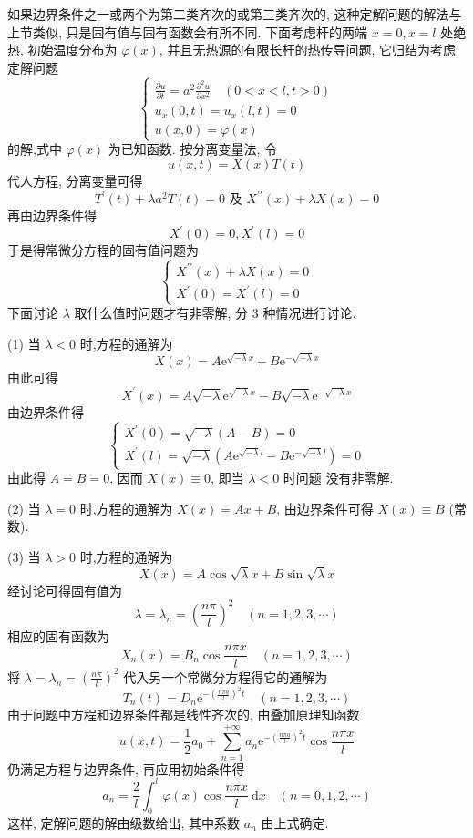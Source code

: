 如果边界条件之一或两个为第二类齐次的或第三类齐次的, 这种定解问题的解法与上节类似, 只是固有值与固有函数会有所不同. 下面考虑杆的两端 $ x=0, x=l $ 处绝热, 初始温度分布为 $ \varphi(x) $, 并且无热源的有限长杆的热传导问题, 它归结为考虑定解问题
$$
\left\{\begin{array}{l}
\frac{\partial u}{\partial t}=a^{2} \frac{\partial^{2} u}{\partial x^{2}} \quad(0<x<l, t>0) \\
u_{x}(0, t)=u_{x}(l, t)=0 \\
u(x, 0)=\varphi(x)
\end{array}\right.
$$
的解,式中 $ \varphi(x) $ 为已知函数.
按分离变量法, 令
$$
u(x, t)=X(x) T(t)
$$
代人方程, 分离变量可得
$$
T^{\prime}(t)+\lambda a^{2} T(t)=0 \text { 及 } X^{\prime \prime}(x)+\lambda X(x)=0
$$
再由边界条件得
$$
X^{\prime}(0)=0, X^{\prime}(l)=0
$$
于是得常微分方程的固有值问题为
$$
\left\{\begin{array}{l}
X^{\prime \prime}(x)+\lambda X(x)=0 \\
X^{\prime}(0)=X^{\prime}(l)=0
\end{array}\right.
$$
下面讨论 $ \lambda $ 取什么值时问题才有非零解, 分 3 种情况进行讨论.

(1) 当 $ \lambda<0 $ 时,方程的通解为
$$
X(x)=A \mathrm{e}^{\sqrt{-\lambda} x}+B \mathrm{e}^{-\sqrt{-\lambda} x}
$$
由此可得
$$
X^{\prime}(x)=A \sqrt{-\lambda} \mathrm{e}^{\sqrt{-\lambda} x}-B \sqrt{-\lambda} \mathrm{e}^{-\sqrt{-\lambda} x}
$$
由边界条件得
$$
\left\{\begin{array}{l}
X^{\prime}(0)=\sqrt{-\lambda}(A-B)=0 \\
X^{\prime}(l)=\sqrt{-\lambda}\left(A \mathrm{e}^{\sqrt{-\lambda} l}-B \mathrm{e}^{-\sqrt{-\lambda} l}\right)=0
\end{array}\right.
$$
由此得 $ A=B=0 $, 因而 $ X(x) \equiv 0 $, 即当 $ \lambda<0 $ 时问题 没有非零解.

(2) 当 $ \lambda=0 $ 时,方程的通解为 $ X(x)=A x+B $, 由边界条件可得 $ X(x) \equiv B $ (常数).

(3) 当 $ \lambda>0 $ 时,方程的通解为
$$
X(x)=A \cos \sqrt{\lambda} x+B \sin \sqrt{\lambda} x
$$
经讨论可得固有值为
$$
\lambda=\lambda_{n}=\left(\frac{n \pi}{l}\right)^{2} \quad(n=1,2,3, \cdots)
$$
相应的固有函数为
$$
X_{n}(x)=B_{n} \cos \frac{n \pi x}{l} \quad(n=1,2,3, \cdots)
$$
将 $ \lambda=\lambda_{n}=\left(\frac{n \pi}{l}\right)^{2} $ 代入另一个常微分方程得它的通解为
$$
T_{n}(t)=D_{n} \mathrm{e}^{-\left(\frac{n \pi a}{l}\right)^{2} t} \quad(n=1,2,3, \cdots)
$$
由于问题中方程和边界条件都是线性齐次的, 由叠加原理知函数
$$
u(x, t)=\frac{1}{2} a_{0}+\sum_{n=1}^{+\infty} a_{n} \mathrm{e}^{-\left(\frac{n \pi a}{l}\right)^{2} t} \cos \frac{n \pi x}{l}
$$
仍满足方程与边界条件, 再应用初始条件得
$$
a_{n}=\frac{2}{l} \int_{0}^{l} \varphi(x) \cos \frac{n \pi x}{l} \mathrm{~d} x \quad(n=0,1,2, \cdots)
$$
这样, 定解问题的解由级数给出, 其中系数 $ a_{n} $ 由上式确定.

